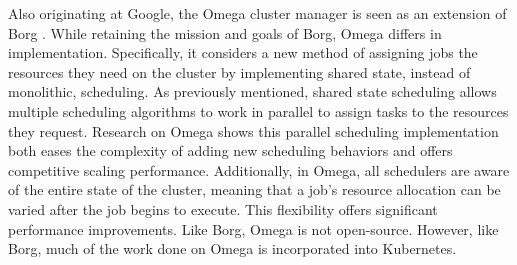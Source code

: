 Also originating at Google, the Omega cluster manager is seen as
an extension of Borg \cite{omega}. While retaining the mission and goals of Borg,
Omega differs in implementation. Specifically, it considers a new method of
assigning jobs the resources they need on the cluster by implementing
shared state, instead of monolithic, scheduling. As previously mentioned,
shared state scheduling allows multiple scheduling algorithms to work
in parallel to assign tasks to the resources they request. Research on Omega shows
this parallel scheduling implementation both eases the complexity of adding new
scheduling behaviors and offers competitive scaling performance.
Additionally, in Omega, all schedulers are aware of the entire
state of the cluster, meaning that a job's resource allocation can be
varied after the job begins to execute. This flexibility offers significant
performance improvements. Like Borg, Omega is not
open-source. However, like Borg, much of the work done on Omega is incorporated
into Kubernetes.
